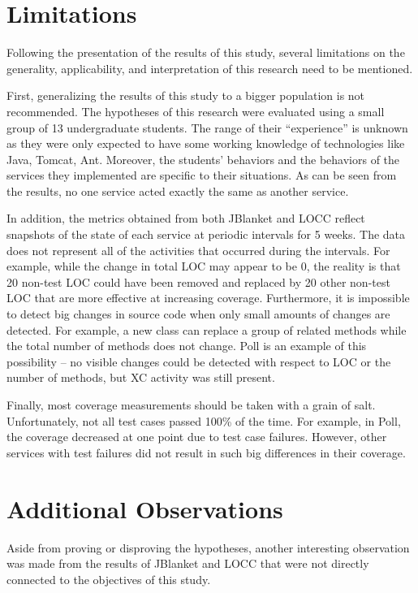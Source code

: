 \section{Limitations} \label{section.limitations}
Following the presentation of the results of this study, several
limitations on the generality, applicability, and interpretation of this
research need to be mentioned.

First, generalizing the results of this study to a bigger population is not
recommended.  The hypotheses of this research were evaluated using a small
group of 13 undergraduate students.  The range of their ``experience'' is
unknown as they were only expected to have some working knowledge of
technologies like Java, Tomcat, Ant.  Moreover, the students' behaviors and
the behaviors of the services they implemented are specific to their
situations.  As can be seen from the results, no one service acted exactly
the same as another service.

In addition, the metrics obtained from both JBlanket and LOCC reflect
snapshots of the state of each service at periodic intervals for 5 weeks.
The data does not represent all of the activities that occurred during the
intervals.  For example, while the change in total LOC may appear to be 0,
the reality is that 20 non-test LOC could have been removed and replaced by
20 other non-test LOC that are more effective at increasing coverage.
Furthermore, it is impossible to detect big changes in source code when
only small amounts of changes are detected.  For example, a new class can
replace a group of related methods while the total number of methods does
not change.  Poll is an example of this possibility -- no visible changes
could be detected with respect to LOC or the number of methods, but XC
activity was still present.

Finally, most coverage measurements should be taken with a grain of salt.
Unfortunately, not all test cases passed 100\% of the time.  For example,
in Poll, the coverage decreased at one point due to test case failures.
However, other services with test failures did not result in such big
differences in their coverage.

\section{Additional Observations} \label{section.additional.observations}
Aside from proving or disproving the hypotheses, another interesting
observation was made from the results of JBlanket and LOCC that were not
directly connected to the objectives of this study.

